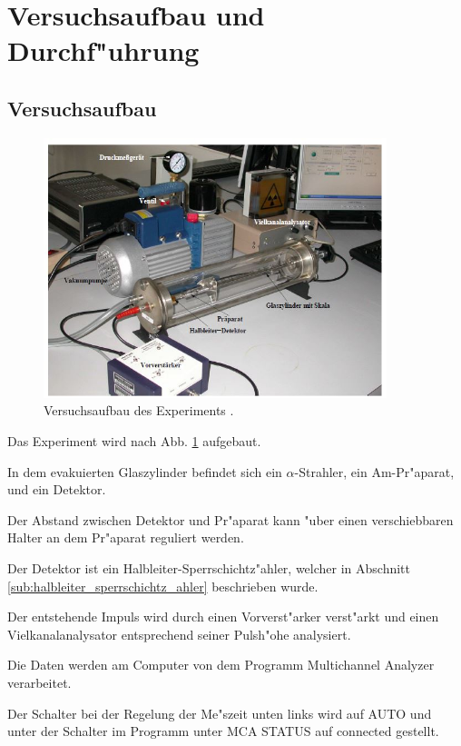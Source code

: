\section{Versuchsaufbau und Durchf"uhrung} %

\label{sec:durchf_uhrung}
	
	\subsection{Versuchsaufbau} %
	\label{sub:versuchsaufbau}
	
	\begin{figure}[!h]
		\centering
		\includegraphics[width = 10cm]{img/Aufbau.JPG}
		\caption{Versuchsaufbau des Experiments \cite{anleitung}.}
		\label{fg:aufbau}
	\end{figure}

	Das Experiment wird nach Abb. \ref{fg:aufbau} aufgebaut.

	In dem evakuierten Glaszylinder befindet sich ein $\alpha$-Strahler, ein Am-Pr"aparat, und ein Detektor.

	Der Abstand zwischen Detektor und Pr"aparat kann "uber einen verschiebbaren Halter an dem Pr"aparat reguliert werden.

	Der Detektor ist ein Halbleiter-Sperrschichtz"ahler, welcher in Abschnitt \ref{sub:halbleiter_sperrschichtz_ahler} beschrieben wurde.

	Der entstehende Impuls wird durch einen Vorverst"arker verst"arkt und einen Vielkanalanalysator entsprechend seiner Pulsh"ohe analysiert.

	Die Daten werden am Computer von dem Programm Multichannel 
	Analyzer verarbeitet.

	Der Schalter bei der Regelung der Me"szeit unten links wird auf AUTO  und unter der Schalter im Programm unter MCA STATUS 
	auf connected gestellt.

